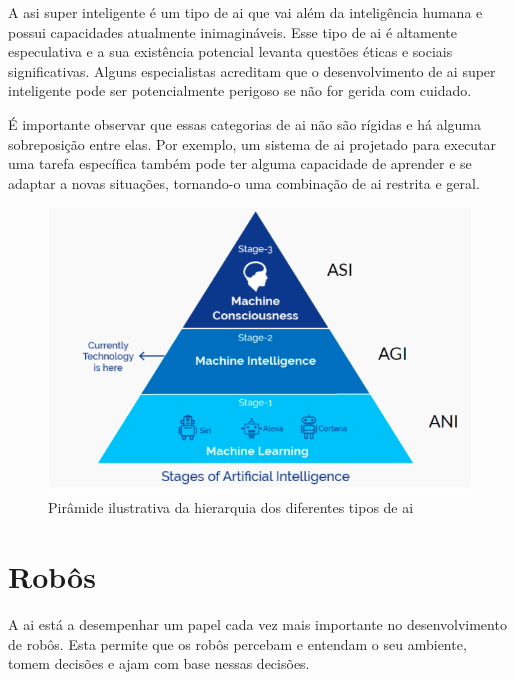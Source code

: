 \documentclass{report}
\begin{document}
A \ac{asi} super inteligente é um tipo de \ac{ai} que vai além da inteligência humana e possui capacidades atualmente inimagináveis. Esse tipo de \ac{ai} é altamente especulativa e a sua existência potencial levanta questões éticas e sociais significativas. Alguns especialistas acreditam que o desenvolvimento de \ac{ai} super inteligente pode ser potencialmente perigoso se não for gerida com cuidado.

\hfill


É importante observar que essas categorias de \ac{ai} não são rígidas e há alguma sobreposição entre elas. Por exemplo, um sistema de \ac{ai} projetado para executar uma tarefa específica também pode ter alguma capacidade de aprender e se adaptar a novas situações, tornando-o uma combinação de \ac{ai} restrita e geral.

\hfill


\hfill


\begin{figure}[h]
    \centering
    \includegraphics[scale=0.6]{tiposdeai.png}
    \caption{Pirâmide ilustrativa da hierarquia dos diferentes tipos de \ac{ai}}
    \label{piramide}
\end{figure}


\chapter{Robôs}
\label{chap.robos}
A \ac{ai} está a desempenhar um papel cada vez mais importante no desenvolvimento de robôs. Esta permite que os robôs percebam e entendam o seu ambiente, tomem decisões e ajam com base nessas decisões.
\end{document}
